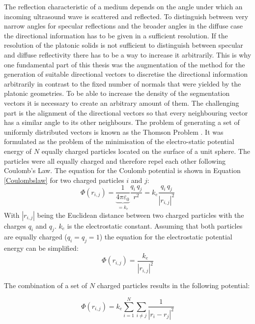 The reflection characteristic of a medium depends on the angle under which an incoming ultrasound wave is scattered and reflected. To distinguish between very narrow angles for specular reflections and the broader angles in the diffuse case the directional information has to be given in a sufficient resolution. If the resolution of the platonic solids is not sufficient to distinguish between specular and diffuse reflectivity there has to be a way to increase it arbitrarily.
This is why one fundamental part of this thesis was the augmentation of the method for the generation of suitable directional vectors to discretise the directional information arbitrarily in contrast to the fixed number of normals that were yielded by the platonic geometries. To be able to increase the density of the segmentation vectors it is necessary to create an arbitrary amount of them. The challenging part is the alignment of the directional vectors so that every neighbouring vector has a similar angle to its other neighbours.
The problem of generating a set of uniformly distributed vectors is known as the Thomson Problem \cite{Thomson1904OnStructure}. It was formulated as the problem of the minimisation of the electro-static potential energy of $N$ equally charged particles located on the surface of a unit sphere. The particles were all equally charged and therefore repel each other following Coulomb's Law. The equation for the Coulomb potential is shown in Equation \ref{Coulombslaw} for two charged particles $i$ and $j$:
\begin{equation}
\Phi(r_{i,j}) = \underset{=k_e}{\underbrace{\frac{1}{4\pi\varepsilon_0}}} \frac{q_i \, q_j}{r^2} =  k_e \frac{q_i \, q_j}{{|r_{i,j}|}^2} 
\label{Coulombslaw}
\end{equation}
With $|r_{i,j}|$ being the Euclidean distance between two charged particles with the charges $q_i$ and $q_j$. $k_e$ is the electrostatic constant. Assuming that both particles are equally charged ($q_i = q_j = 1$) the equation for the electrostatic potential energy can be simplified:
\begin{equation}
\Phi(r_{i,j}) = \frac{k_e}{{|r_{i,j}|}^2} 
\label{Coulombslaw_simple}
\end{equation}

The combination of a set of $N$ charged particles results in the following potential:

\begin{equation}
\Phi(r_{i,j}) = k_e \sum_{i = 1}^{N}\sum_{i \neq j}^{}\frac{1}{{|r_{i}-r_{j}|}^2} 
\label{Coulombslaw_simple_set_n}
\end{equation}


